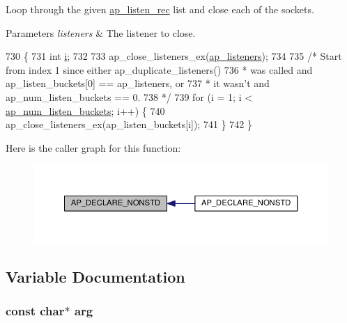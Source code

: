 Loop through the given \hyperlink{structap__listen__rec}{ap\+\_\+listen\+\_\+rec} list and close each of the sockets. 
\begin{DoxyParams}{Parameters}
{\em listeners} & The listener to close. \\
\hline
\end{DoxyParams}

\begin{DoxyCode}
730 \{
731     \textcolor{keywordtype}{int} \hyperlink{group__MOD__PROXY_ga38403a0592eb8018a3ad61aef0f7ca2c}{i};
732 
733     ap\_close\_listeners\_ex(\hyperlink{group__APACHE__CORE__LISTEN_ga56c54ed44b1a272142d9fe4dd5a81a82}{ap\_listeners});
734 
735     \textcolor{comment}{/* Start from index 1 since either ap\_duplicate\_listeners()}
736 \textcolor{comment}{     * was called and ap\_listen\_buckets[0] == ap\_listeners, or}
737 \textcolor{comment}{     * it wasn't and ap\_num\_listen\_buckets == 0.}
738 \textcolor{comment}{     */}
739     \textcolor{keywordflow}{for} (i = 1; i < \hyperlink{group__APACHE__CORE__LISTEN_ga0d73e566cf6c3a900b04c72a5c67ead2}{ap\_num\_listen\_buckets}; i++) \{
740         ap\_close\_listeners\_ex(ap\_listen\_buckets[i]);
741     \}
742 \}
\end{DoxyCode}


Here is the caller graph for this function\+:
\nopagebreak
\begin{figure}[H]
\begin{center}
\leavevmode
\includegraphics[width=350pt]{group__APACHE__CORE__MUTEX_ga8171cd49a25e2f0dfc927b1381b23609_icgraph}
\end{center}
\end{figure}




\subsection{Variable Documentation}
\subsubsection[{\texorpdfstring{arg}{arg}}]{ const char$\ast$ arg}\hypertarget{group__APACHE__CORE__MUTEX_gaf6517210150d97cd5cb8a17e3768770d}{}\label{group__APACHE__CORE__MUTEX_gaf6517210150d97cd5cb8a17e3768770d}
